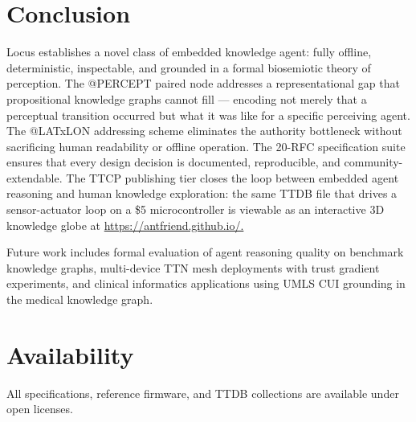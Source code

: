 \documentclass[11pt]{article}
\begin{document}

\section{Conclusion}


Locus establishes a novel class of embedded knowledge agent: fully offline, deterministic, inspectable, and grounded in a formal biosemiotic theory of perception. The @PERCEPT paired node addresses a representational gap that propositional knowledge graphs cannot fill --- encoding not merely that a perceptual transition occurred but what it was like for a specific perceiving agent. The @LATxLON addressing scheme eliminates the authority bottleneck without sacrificing human readability or offline operation. The 20-RFC specification suite ensures that every design decision is documented, reproducible, and community-extendable. The TTCP publishing tier closes the loop between embedded agent reasoning and human knowledge exploration: the same TTDB file that drives a sensor-actuator loop on a \$5 microcontroller is viewable as an interactive 3D knowledge globe at \url{https://antfriend.github.io/.}

Future work includes formal evaluation of agent reasoning quality on benchmark knowledge graphs, multi-device TTN mesh deployments with trust gradient experiments, and clinical informatics applications using UMLS CUI grounding in the medical knowledge graph.



\section{Availability}


All specifications, reference firmware, and TTDB collections are available under open licenses.
\end{document}
